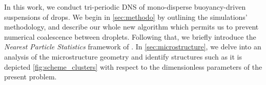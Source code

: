 In this work, we conduct tri-periodic DNS of mono-disperse buoyancy-driven suspensions of drops. 
We begin in \ref{sec:methodo} by outlining the simulations' methodology, and describe our whole new algorithm which permits us to prevent numerical coalescence between droplets. 
Following that, we briefly introduce the \textit{Nearest Particle Statistics} framework of \citet{zhang2023evolution}. 
In \ref{sec:microstructure}, we delve into an analysis of the microstructure geometry and identify structures such as it is depicted \ref{fig:scheme_clusters} with respect to the dimensionless parameters of the present problem. 
 
